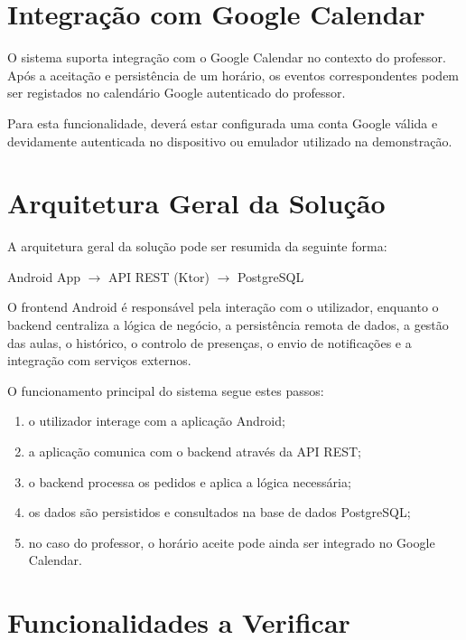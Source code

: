 \documentclass[]{article}
\begin{document}
    \section{Integração com Google Calendar}

    O sistema suporta integração com o Google Calendar no contexto do professor. Após a aceitação e persistência de um horário, os eventos correspondentes podem ser registados no calendário Google autenticado do professor.

    Para esta funcionalidade, deverá estar configurada uma conta Google válida e devidamente autenticada no dispositivo ou emulador utilizado na demonstração.

    \section{Arquitetura Geral da Solução}

    A arquitetura geral da solução pode ser resumida da seguinte forma:

    \begin{center}
        Android App $\rightarrow$ API REST (Ktor) $\rightarrow$ PostgreSQL
    \end{center}

    O frontend Android é responsável pela interação com o utilizador, enquanto o backend centraliza a lógica de negócio, a persistência remota de dados, a gestão das aulas, o histórico, o controlo de presenças, o envio de notificações e a integração com serviços externos.

    O funcionamento principal do sistema segue estes passos:

    \begin{enumerate}
        \item o utilizador interage com a aplicação Android;
        \item a aplicação comunica com o backend através da API REST;
        \item o backend processa os pedidos e aplica a lógica necessária;
        \item os dados são persistidos e consultados na base de dados PostgreSQL;
        \item no caso do professor, o horário aceite pode ainda ser integrado no Google Calendar.
    \end{enumerate}

    \section{Funcionalidades a Verificar}
\end{document}
